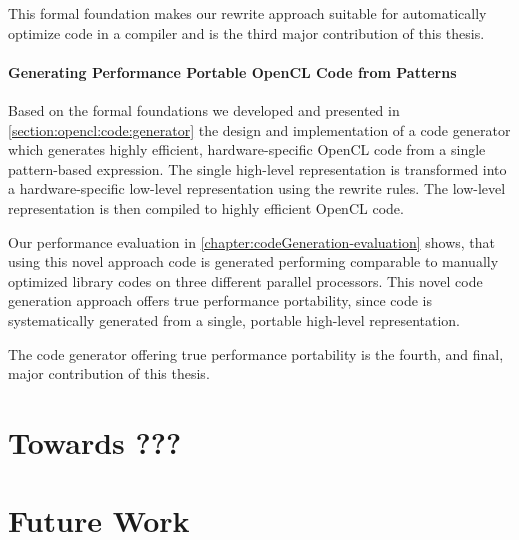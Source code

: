 \bigskip
This formal foundation makes our rewrite approach suitable for automatically optimize code in a compiler and is the third major contribution of this thesis.

\paragraph{Generating Performance Portable OpenCL Code from Patterns}
Based on the formal foundations we developed and presented in \autoref{section:opencl:code:generator} the design and implementation of a code generator which generates highly efficient, hardware-specific OpenCL code from a single pattern-based expression.
The single high-level representation is transformed into a hardware-specific low-level representation using the rewrite rules.
The low-level representation is then compiled to highly efficient OpenCL code.

Our performance evaluation in \autoref{chapter:codeGeneration-evaluation} shows, that using this novel approach code is generated performing comparable to manually optimized library codes on three different parallel processors.
This novel code generation approach offers true performance portability, since code is systematically generated from a single, portable high-level representation.

\bigskip
The code generator offering true performance portability is the fourth, and final, major contribution of this thesis.


\section{Towards ???}


\section{Future Work}
\label{section:future-work}


